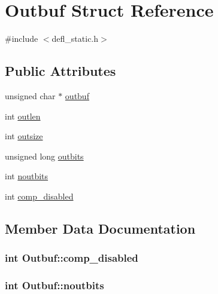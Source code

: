 \hypertarget{structOutbuf}{}\section{Outbuf Struct Reference}
\label{structOutbuf}


{\ttfamily \#include $<$defl\+\_\+static.\+h$>$}

\subsection*{Public Attributes}
\begin{DoxyCompactItemize}
\item 
unsigned char $\ast$ \hyperlink{structOutbuf_acab7b3c6c932d62ab4013745fa06d988}{outbuf}
\item 
int \hyperlink{structOutbuf_a6be82c0a4c7034071393ad2803eff07a}{outlen}
\item 
int \hyperlink{structOutbuf_a543a71c42713b6a3a5141e7ec91be329}{outsize}
\item 
unsigned long \hyperlink{structOutbuf_ac2e004cb99bcfd2e064f78558ec6d451}{outbits}
\item 
int \hyperlink{structOutbuf_a13c58e673c89045d58f29ecf409410e7}{noutbits}
\item 
int \hyperlink{structOutbuf_ae5f8d273259b8887ec6d7ac4ab8818aa}{comp\+\_\+disabled}
\end{DoxyCompactItemize}


\subsection{Member Data Documentation}
\subsubsection[{\texorpdfstring{comp\+\_\+disabled}{comp_disabled}}]{\setlength{\rightskip}{0pt plus 5cm}int Outbuf\+::comp\+\_\+disabled}\hypertarget{structOutbuf_ae5f8d273259b8887ec6d7ac4ab8818aa}{}\label{structOutbuf_ae5f8d273259b8887ec6d7ac4ab8818aa}
\subsubsection[{\texorpdfstring{noutbits}{noutbits}}]{\setlength{\rightskip}{0pt plus 5cm}int Outbuf\+::noutbits}\hypertarget{structOutbuf_a13c58e673c89045d58f29ecf409410e7}{}\label{structOutbuf_a13c58e673c89045d58f29ecf409410e7}

